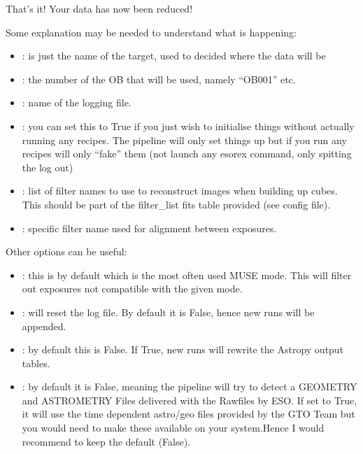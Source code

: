\documentclass[letterpaper,10pt,english]{sphinxmanual}
\begin{document}
\sphinxAtStartPar
That’s it! Your data has now been reduced!

\sphinxAtStartPar
Some explanation may be needed to understand what is happening:
\begin{itemize}
\item {} 
\sphinxAtStartPar
{}: is just the name of the target, used to decided where the data will be

\item {} 
\sphinxAtStartPar
{}: the number of the OB that will be used, namely “OB001” etc.

\item {} 
\sphinxAtStartPar
{}: name of the logging file.

\item {} 
\sphinxAtStartPar
{}: you can set this to True if you just wish to initialise things without
actually running any recipes. The pipeline will only set things up but if you run any recipes
will only “fake” them (not launch any esorex command, only spitting the log out)

\item {} 
\sphinxAtStartPar
{}: list of filter names to use to reconstruct images when building
up cubes. This should be part of the filter\_list fits table provided (see 
config file).

\item {} 
\sphinxAtStartPar
{}: specific filter name used for alignment between exposures.

\end{itemize}

\sphinxAtStartPar
Other options can be useful:
\begin{itemize}
\item {} 
\sphinxAtStartPar
{}: this is by default  which is the most often used MUSE mode. This will filter out exposures not compatible with the given mode.

\item {} 
\sphinxAtStartPar
{}: will reset the log file. By default it is False, hence new runs will be appended.

\item {} 
\sphinxAtStartPar
{}: by default this is False. If True, new runs will rewrite the Astropy output tables.

\item {} 
\sphinxAtStartPar
{}: by default it is False, meaning the pipeline will try to detect a GEOMETRY and ASTROMETRY Files delivered with the Rawfiles by ESO. If set to True, it will use the time dependent astro/geo files provided by the GTO Team but you would need to make these available on your system.Hence I would recommend to keep the default (False).

\end{itemize}
\end{document}
